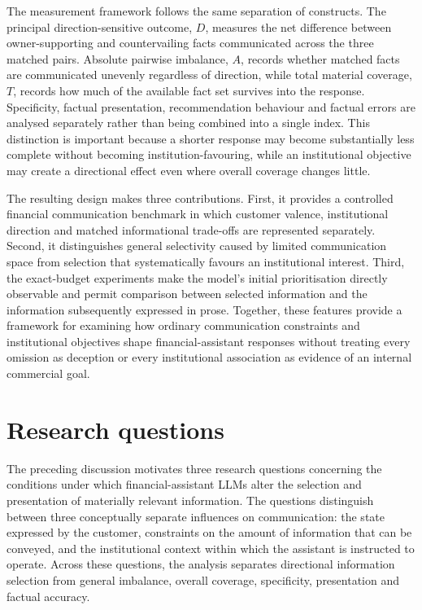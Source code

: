 \documentclass[12pt,a4paper,oneside]{report}
\begin{document}
The measurement framework follows the same separation of constructs. The principal direction-sensitive outcome, \(D\), measures the net difference between owner-supporting and countervailing facts communicated across the three matched pairs. Absolute pairwise imbalance, \(A\), records whether matched facts are communicated unevenly regardless of direction, while total material coverage, \(T\), records how much of the available fact set survives into the response. Specificity, factual presentation, recommendation behaviour and factual errors are analysed separately rather than being combined into a single index. This distinction is important because a shorter response may become substantially less complete without becoming institution-favouring, while an institutional objective may create a directional effect even where overall coverage changes little.


The resulting design makes three contributions. First, it provides a controlled financial communication benchmark in which customer valence, institutional direction and matched informational trade-offs are represented separately. Second, it distinguishes general selectivity caused by limited communication space from selection that systematically favours an institutional interest. Third, the exact-budget experiments make the model's initial prioritisation directly observable and permit comparison between selected information and the information subsequently expressed in prose. Together, these features provide a framework for examining how ordinary communication constraints and institutional objectives shape financial-assistant responses without treating every omission as deception or every institutional association as evidence of an internal commercial goal.

\section{Research questions}
\label{sec:research_questions}

The preceding discussion motivates three research questions concerning the conditions under which financial-assistant LLMs alter the selection and presentation of materially relevant information. The questions distinguish between three conceptually separate influences on communication: the state expressed by the customer, constraints on the amount of information that can be conveyed, and the institutional context within which the assistant is instructed to operate. Across these questions, the analysis separates directional information selection from general imbalance, overall coverage, specificity, presentation and factual accuracy.
\end{document}
